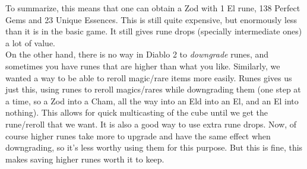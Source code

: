 \documentclass[12pt,a4paper]{article}
\begin{document}
To summarize, this means that one can obtain a Zod with 1 El rune, 138 Perfect Gems and 23 Unique Essences. This is still quite expensive, but enormously less than it is in the basic game. It still gives rune drops (specially intermediate ones) a lot of value.\\

On the other hand, there is no way in Diablo 2 to {\emph{downgrade}} runes, and sometimes you have runes that are higher than what you like. Similarly, we wanted a way to be able to reroll magic/rare items more easily. Runes gives us just this, using runes to reroll magics/rares while downgrading them (one step at a time, so a Zod into a Cham, all the way into an Eld into an El, and an El into nothing). This allows for quick multicasting of the cube until we get the rune/reroll that we want. It is also a good way to use extra rune drops. Now, of course higher runes take more to upgrade and have the same effect when downgrading, so it's less worthy using them for this purpose. But this is fine, this makes saving higher runes worth it to keep.

\end{document}
